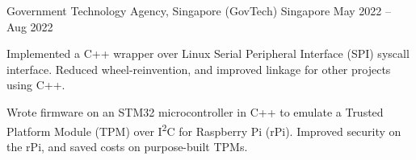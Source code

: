 \begin{cventries}

	{Government Technology Agency, Singapore (GovTech)} %
	{Singapore} %
	{May 2022 -- Aug 2022} %
	{
		\begin{cvitems} %
			\item Implemented a C++ wrapper over Linux Serial Peripheral Interface (SPI) syscall interface. Reduced wheel-reinvention, and improved linkage for other projects using C++.
			\item Wrote firmware on an STM32 microcontroller in C++ to emulate a Trusted Platform Module (TPM) over I\textsuperscript{2}C for Raspberry Pi (rPi). Improved security on the rPi, and saved costs on purpose-built TPMs.
		\end{cvitems}
	}


\end{cventries}
